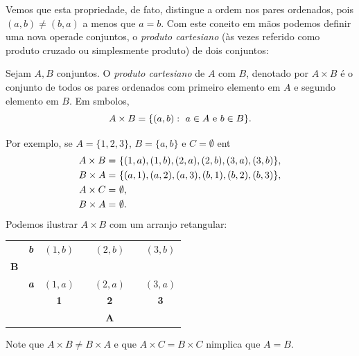 Vemos que esta propriedade, de fato, distingue a ordem nos pares ordenados, pois $(a,b)\neq(b,a)$ a menos que $a=b$.  Com este coneito em m\~aos podemos definir uma nova opera\cao de conjuntos, o {\it produto cartesiano} (\`as vezes referido como produto cruzado ou simplesmente produto) de dois conjuntos:
\begin{definb}
Sejam $A,B$ conjuntos. O {\it produto cartesiano} de $A$ com $B$, denotado por $A\times B$ \'e o conjunto de todos os pares ordenados com primeiro elemento em $A$ e segundo elemento em $B$. Em s\ih mbolos,
\[
A\times B = \{(a,b):\textrm{ } a\in A \text{ e } b\in B\}.
\]
\end{definb}
Por exemplo, se $A=\{1,2,3\}$, $B=\{a,b\}$ e $C=\emptyset$ ent\ao
\begin{equation*}
 \begin{aligned}
A\times B=&\textrm{ } \{(1,a),(1,b),(2,a),(2,b),(3,a),(3,b)\},\\
B\times A=&\textrm{ } \{(a,1),(a,2),(a,3),(b,1),(b,2),(b,3)\},\\
A\times C=&\textrm{ } \emptyset,\\
B\times A=&\textrm{ } \emptyset.
 \end{aligned}
\end{equation*}
Podemos ilustrar $A\times B$ com um arranjo retangular:
\begin{table}[h]
\centering
\begin{tabular}{ccccccc}
\multicolumn{1}{c}{       } &  \multicolumn{1}{c|}{\textit{\textbf b}} & $(1,b)$ & \quad& $(2,b)$ &\quad & $(3,b)$  \\
\multicolumn{1}{c}{{\bf B}} &  \multicolumn{1}{c|}{                  } &         & \quad&         &\quad &          \\
\multicolumn{1}{c}{       } &  \multicolumn{1}{c|}{\textit{\textbf a}} & $(1,a)$ & \quad& $(2,a)$ &\quad & $(3,a)$  \\\cline{3-7}
                            &                               & {\bf 1} & \quad& {\bf 2} &\quad & {\bf 3}   \\
                            &                               &         & \quad& {\bf A} &\quad &           \\
\end{tabular}
\end{table}
Note que $A\times B\neq B\times A$ e que $A\times C=B\times C$ n\ao implica que $A=B$.

